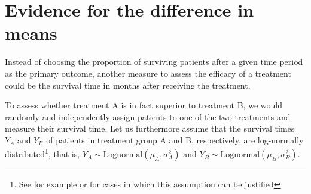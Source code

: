 \section{Evidence for the difference in means}
\label{sec:mean}
Instead of choosing the proportion of surviving patients after a given time period as the primary outcome, another measure to assess the efficacy of a treatment could be the survival time in months after receiving the treatment.\par 
To assess whether treatment A is in fact superior to treatment B, we would randomly and independently assign patients to one of the two treatments and measure their survival time. Let us furthermore assume that the survival times $Y_A$ and $Y_B$ of patients in treatment group A and B, respectively, are log-normally distributed\footnote{See for example \citet{royston_lognormal_2001} or \citet{chapman_innovative_2013} for cases in which this assumption can be justified}, that is, ${Y_A \sim \text{Lognormal}(\mu_A, \sigma_A^2)}$ and ${Y_B \sim \text{Lognormal}(\mu_B, \sigma_B^2)}$.\par

